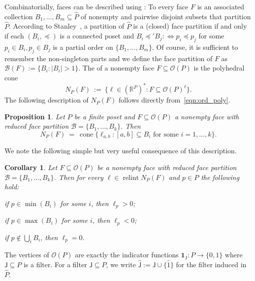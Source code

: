 \documentclass[11pt]{amsart}
\newtheorem{cor}[thm]{Corollary}
\newtheorem{prop}[thm]{Proposition}
\theoremstyle{definition}
\begin{document}
Combinatorially, faces can be described using {\textbf{\color{black}{face partitions}}}: To every
face $F$ is an associated collection $B_1,\dots,B_m \subseteq {\widehat{P}}$ of
nonempty and pairwise disjoint subsets that partition ${\widehat{P}}$. According to
Stanley~\cite[Thm~1.2]{TwoPoset}, a partition of ${\widehat{P}}$ is a (closed) face
partition if and only if each $(B_i, \preceq)$ is a connected poset and $B_i
\preceq' B_j :\Leftrightarrow p_i \preceq p_j$ for some $p_i \in B_i, p_j \in
B_j$ is a partial order on $\{B_1,\dots,B_m\}$. Of course, it is sufficient to
remember the non-singleton parts and we define the {\textbf{\color{black}{reduced}}} face
partition of $F$ as ${\mathcal{B}}(F) := \{ B_i : |B_i| > 1 \}$.  The {\textbf{\color{black}{normal
cone}}} of a nonempty face $F \subseteq {\mathcal{O}({P})}$ is the polyhedral cone
\[
    {N}_{P}(F) \ := \ \{ \ell \in ({\mathbb{R}}^{P})^* : F \subseteq {\mathcal{O}({P})}^\ell \}.
\]
The following description of ${N}_{P}(F)$ follows directly
from~\eqref{eqn:ord_poly}.

\begin{prop}\label{prop:NC}
    Let ${P}$ be a finite poset and  $F \subseteq {\mathcal{O}({P})}$ a nonempty face
    with reduced face partition ${\mathcal{B}} = \{B_1,\dots,B_k\}$. Then
    \[
        {N}_{P}(F) \ = \ \operatorname{cone} \{\ell_{a,b}: [a,b] \subseteq B_i \text{ for
        some }i=1,\dots,k \}.
    \]
\end{prop}

We note the following simple but very useful consequence of this
description. 

\begin{cor}\label{cor:maxmin}
    Let $F \subseteq {\mathcal{O}({P})}$ be a nonempty face with reduced face partition
    ${\mathcal{B}} = \{ B_1,\dots,B_k \}$. Then for every $\ell \in \operatorname{relint} 
    {N}_{P}(F)$ and $p \in {P}$ the following hold: 
    \begin{compactenum}[\rm (i)]
    \item if $p \in \min(B_i)$ for some $i$, then $\ell_p > 0$;
    \item if $p \in \max(B_i)$ for some $i$, then $\ell_p < 0$;
    \item if $p \not\in \bigcup_i B_i$, then $\ell_p = 0$.
    \end{compactenum}
\end{cor}

The vertices of ${\mathcal{O}({P})}$ are exactly the indicator functions ${\mathbf{1}}_{\mathsf{J}} :
{P} \rightarrow \{0,1\}$ where ${\mathsf{J}} \subseteq {P}$ is a filter.  For a
filter ${\mathsf{J}} \subseteq {P}$, we write $\widehat{\mathsf{J}} := {\mathsf{J}} \cup
\{{\widehat{1}}\}$ for the filter induced in ${\widehat{P}}$. 
\end{document}
